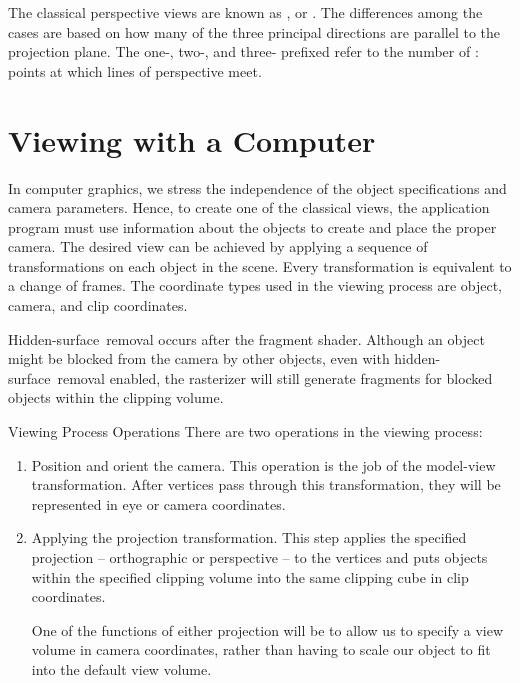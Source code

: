 \documentclass[../COS3712_Notes.tex]{subfiles}
\begin{document}
        The classical perspective views are known as ,  or
        .
        The differences among the cases are based on how many of the three principal directions
        are parallel to the projection plane.
        The one-, two-, and three- prefixed refer to the number of :
        points at which lines of perspective meet.

    \section{Viewing with a Computer}
      In computer graphics, we stress the independence of the object specifications
      and camera parameters.
      Hence, to create one of the classical views, the application program must use information
      about the objects to create and place the proper camera.
      The desired view can be achieved by applying a sequence of transformations on each object
      in the scene.
      Every transformation is equivalent to a change of frames.
      The coordinate types used in the viewing process are object, camera, and clip coordinates.

      Hidden-surface~removal occurs after the fragment shader.
      Although an object might be blocked from the camera by other objects,
      even with hidden-surface~removal enabled, the rasterizer will still generate fragments
      for blocked objects within the clipping volume.

      \begin{sidenote}{Viewing Process Operations}
        There are two operations in the viewing process:
        \begin{enumerate}
          \item Position and orient the camera.
            This operation is the job of the model-view transformation.
            After vertices pass through this transformation, they will be represented
            in eye or camera coordinates.
          \item Applying the projection transformation.
            This step applies the specified projection -- orthographic or perspective --
            to the vertices and puts objects within the specified clipping volume
            into the same clipping cube in clip coordinates.

            One of the functions of either projection will be to allow us to specify a view volume
            in camera coordinates, rather than having to scale our object to fit into the
            default view volume.
        \end{enumerate}
      \end{sidenote}
\end{document}
